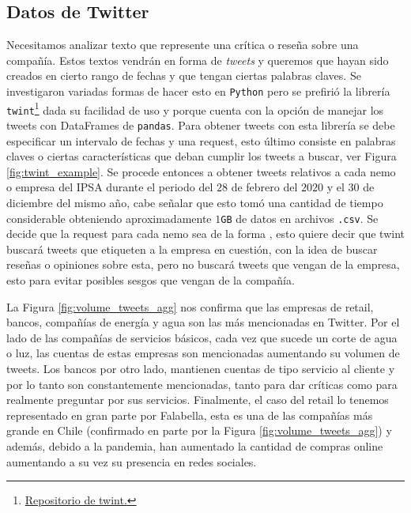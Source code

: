 \documentclass{article}
\begin{document}
\subsection{Datos de Twitter}
Necesitamos analizar texto que represente una crítica o reseña sobre una compañía. Estos textos vendrán en forma de \textit{tweets} y queremos que hayan sido creados en cierto rango de fechas y que tengan ciertas palabras claves. Se investigaron variadas formas de hacer esto en \texttt{Python} pero se prefirió la librería \texttt{twint}\footnote{\href{https://github.com/twintproject/twint}{Repositorio de twint.}} dada su facilidad de uso y porque cuenta con la opción de manejar los tweets con DataFrames de \texttt{pandas}. Para obtener tweets con esta librería se debe especificar un intervalo de fechas y una request, esto último consiste en palabras claves o ciertas características que deban cumplir los tweets a buscar, ver Figura \ref{fig:twint_example}.
Se procede entonces a obtener tweets relativos a cada nemo o empresa del IPSA durante el periodo del $28$ de febrero del $2020$ y el $30$ de diciembre del mismo año, cabe señalar que esto tomó una cantidad de tiempo considerable obteniendo aproximadamente $1$\texttt{GB} de datos en archivos \texttt{.csv}. Se decide que la request para cada nemo sea de la forma , esto quiere decir que twint buscará tweets que etiqueten a la empresa en cuestión, con la idea de buscar reseñas o opiniones sobre esta, pero no buscará tweets que vengan de la empresa, esto para evitar posibles sesgos que vengan de la compañía.

La Figura \ref{fig:volume_tweets_agg} nos confirma que las empresas de retail, bancos, compañías de energía y agua son las más mencionadas en Twitter. Por el lado de las compañías de servicios básicos, cada vez que sucede un corte de agua o luz, las cuentas de estas empresas son mencionadas aumentando su volumen de tweets. Los bancos por otro lado, mantienen cuentas de tipo servicio al cliente y por lo tanto son constantemente mencionadas, tanto para dar críticas como para realmente preguntar por sus servicios. Finalmente, el caso del retail lo tenemos representado en gran parte por Falabella, esta es una de las compañías más grande en Chile (confirmado en parte por la Figura \ref{fig:volume_tweets_agg}) y además, debido a la pandemia, han aumentado la cantidad de compras online aumentando a su vez su presencia en redes sociales.
\end{document}
